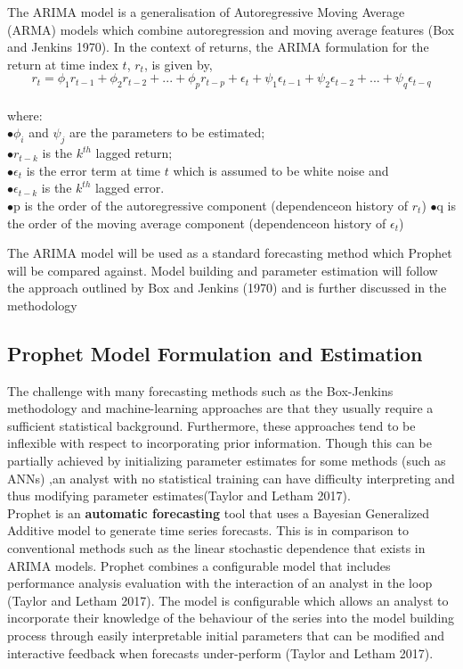 \documentclass[12pt,a4paper]{article}
\numberwithin{equation}{section}
\numberwithin{figure}{section}
\numberwithin{table}{section}
\begin{document}
The ARIMA model is a generalisation of Autoregressive Moving Average
(ARMA) models which combine autoregression and moving average features
(Box and Jenkins 1970). In the context of returns, the ARIMA formulation
for the return at time index \(t\), \(r_t\), is given by,
\[  r_t = \phi_1 r_{t-1} + \phi_2 r_{t-2} + ...+ \phi_p r_{t-p} + \epsilon_t +
        \psi_1 \epsilon_{t-1} + \psi_2 \epsilon_{t-2} + ... +\psi_q \epsilon_{t-q} \]\\
where:\\
\(\bullet \phi_i\) and \(\psi_j\) are the parameters to be estimated;\\
\(\bullet r_{t-k}\) is the \(k^{th}\) lagged return;\\
\(\bullet \epsilon_t\) is the error term at time \(t\) which is assumed
to be white noise and\\
\(\bullet\epsilon_{t-k}\) is the \(k^{th}\) lagged error.\\
\(\bullet\)p is the order of the autoregressive component (dependenceon
history of \(r_t\)) \(\bullet\)q is the order of the moving average
component (dependenceon history of \(\epsilon_t\))

The ARIMA model will be used as a standard forecasting method which
Prophet will be compared against. Model building and parameter
estimation will follow the approach outlined by Box and Jenkins (1970)
and is further discussed in the methodology

\subsection{Prophet Model Formulation and
Estimation}\label{prophet-model-formulation-and-estimation}

The challenge with many forecasting methods such as the Box-Jenkins
methodology and machine-learning approaches are that they usually
require a sufficient statistical background. Furthermore, these
approaches tend to be inflexible with respect to incorporating prior
information. Though this can be partially achieved by initializing
parameter estimates for some methods (such as ANNs) ,an analyst with no
statistical training can have difficulty interpreting and thus modifying
parameter estimates(Taylor and Letham 2017).\\
Prophet is an \textbf{automatic forecasting} tool that uses a Bayesian
Generalized Additive model to generate time series forecasts. This is in
comparison to conventional methods such as the linear stochastic
dependence that exists in ARIMA models. Prophet combines a configurable
model that includes performance analysis evaluation with the interaction
of an analyst in the loop (Taylor and Letham 2017). The model is
configurable which allows an analyst to incorporate their knowledge of
the behaviour of the series into the model building process through
easily interpretable initial parameters that can be modified and
interactive feedback when forecasts under-perform (Taylor and Letham
2017).
\end{document}
